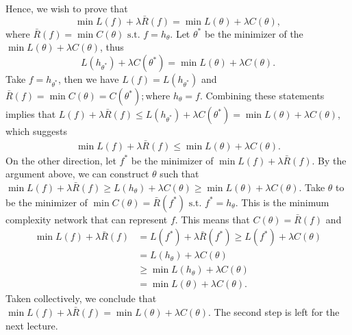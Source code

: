 Hence, we wish to prove that
$$ \min L(f) + \lambda \bar{R}(f) = \min L(\theta) + \lambda C(\theta),$$
where $\bar{R}(f) = \min C(\theta) \mbox{   s.t.   } f = h_{\theta}$. Let $\theta^*$ be the minimizer of the $\min L(\theta) + \lambda C(\theta)$, thus
$$
L(h_{\theta^*}) + \lambda C(\theta^*) = \min L(\theta) + \lambda C(\theta).
$$
Take $f = h_{\theta^*}$, then we have $L(f) = L(h_{\theta^*})$ and $\bar{R}(f) = \min C(\theta) = C(\theta^*); \text{where   } h_\theta = f$. Combining these statements implies that $L(f) + \lambda \bar{R}(f) \leq L(h_{\theta^*}) + \lambda C(\theta^*) = \min L(\theta) + \lambda C(\theta) $, which suggests
\begin{align}
	\min L(f) + \lambda \bar{R}(f) \leq \min L(\theta) + \lambda C(\theta).
\end{align}
On the other direction, let $f^*$ be the minimizer of $\min L(f) + \lambda \bar{R}(f)$. By the argument above, we can construct $\theta$ such that $ \min L(f) + \lambda \bar{R}(f) \geq L(h_\theta) + \lambda C(\theta) \geq \min L(\theta) + \lambda C(\theta)$. Take $\theta$ to be the minimizer of $\min C(\theta) = \bar{R}(f^*) \mbox{   s.t.   } f^* = h_\theta$. This is the minimum complexity network that can represent $f$. This means that $C(\theta) = \bar{R}(f)$ and 
\begin{align}
\min L(f) + \lambda \bar{R}(f) & = L(f^*) + \lambda \bar{R}(f^*) \geq L(f^*) + \lambda C(\theta) \nonumber \\
& = L(h_\theta) + \lambda C(\theta) \nonumber \\
&\geq \min L(h_\theta) + \lambda C(\theta) \nonumber \\
& = \min L(\theta) + \lambda C(\theta).
\end{align}
Taken collectively, we conclude that $\min L(f) + \lambda \bar{R}(f) = \min L(\theta) + \lambda C(\theta)$. The second step is left for the next lecture.
